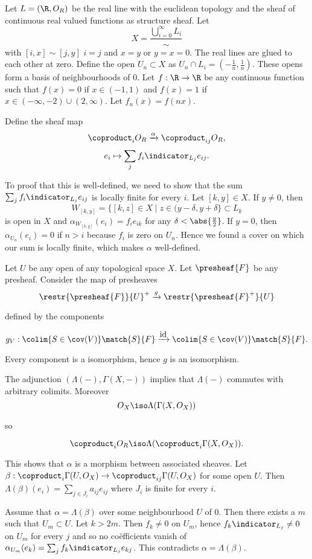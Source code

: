 Let $L = (\R, O_R)$ be the real line with the euclidean topology and the sheaf of continuous real valued functions as structure sheaf.
Let \[X = \frac{\bigcup_{i=0}^\infty L_i}{\sim}\] with $[i,x] \sim [j,y]$ \iff $i=j$ and $x=y$ or $y=x=0$. 
The real lines are glued to each other at zero.
Define the open $U_n\subset X$ as $U_n\cap L_i=(-\frac{1}{n},\frac{1}{n})$. 
These opens form a basis of neighbourhoods of $0$.
Let $f:\R\rightarrow \R$ be any continuous function such that $f(x)=0$ 
if $x\in (-1,1)$ and $f(x)=1$ if $x\in (-\infty,-2)\cup (2,\infty)$.
Let $f_n(x)=f(nx)$.

Define the sheaf map 
\[\coproduct_i O_R \xrightarrow{\alpha} \coproduct_{ij} O_R,\]
\[e_i \mapsto \sum_{j} f_i \indicator_{L_j} e_{ij}.\]

To proof that this is well-defined, we need to show that the sum $\sum_{j} f_i \indicator_{L_j} e_{ij}$ 
is locally finite for every $i$.
Let $[k,y]\in X$. If $y\neq 0$, then \[W_{[k,y]}=\{[k,z]\in X \mid z\in(y-\delta, y+\delta\}\subset L_k\] is open in $X$
and $\alpha_{W_{[k,y]}}(e_i)  = f_ie_{ik}$ for any $\delta< \abs{\frac{y}{2}}$.
If $y=0$, then $\alpha_{U_n}(e_i) = 0$ if $n>i$ because $f_i$ is zero on $U_n$.
Hence we found a cover on which our sum is locally finite, which makes $\alpha$ well-defined.


Let $U$ be any open of any topological space $X$. 
Let $\presheaf{F}$ be any presheaf.
Consider the map of presheaves
\[\restr{\presheaf{F}}{U}^{+}\xrightarrow{g} \restr{\presheaf{F}^{+}}{U}\]

defined by the components

\[g_V: \colim{S\in \cov(V)} \match{S}{F} \xrightarrow{\mbox{id}} \colim{S\in \cov(V)} \match{S}{F}.\]

Every component is a isomorphism, hence $g$ is an isomorphism.

The adjunction $(\Lambda(-),\Gamma(X,-))$ implies that $\Lambda(-)$ commutes with arbitrary colimits.
Moreover
\[O_X \iso \Lambda(\Gamma(X,O_X))\]

so

\[\coproduct_i O_R \iso \Lambda(\coproduct_i \Gamma(X,O_X)).\]

This shows that $\alpha$ is a morphism between associated sheaves.
Let $\beta: \coproduct_i \Gamma(U,O_X)\rightarrow \coproduct_{ij} \Gamma(U,O_X)$ for some open $U$.
Then $\Lambda(\beta)(e_i) = \sum_{j\in J_i} a_{ij} e_{ij}$ where $J_i$ is finite for every $i$.

Assume that $\alpha = \Lambda(\beta)$ over some neighbourhood $U$ of $0$.
Then there exists a $m$ such that $U_m\subset U$. Let $k>2m$.
Then $f_k\neq 0$ on $U_m$, hence $f_k \indicator_{L_j}\neq 0$ on $U_m$ for every $j$ and so no co{\"e}fficients vanish of $\alpha_{U_m}(e_k) =\sum_{j} f_k \indicator_{L_j} e_{kj}$. 
This contradicts $\alpha=\Lambda(\beta)$.